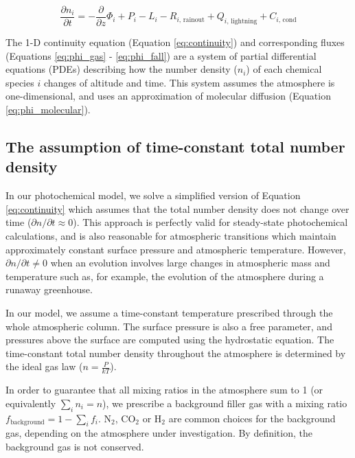 \documentclass{article}
\begin{document}
\begin{equation} \label{eq:continuity}
\frac{\partial n_{i}}{\partial t} = - \frac{\partial}{\partial z}\Phi_{i} + P_{i} - L_{i} - R_{i\text{, rainout}} + Q_{i\text{, lightning}} + C_{i\text{, cond}}
\end{equation}

The 1-D continuity equation (Equation \eqref{eq:continuity}) and corresponding fluxes (Equations \eqref{eq:phi_gas} - \eqref{eq:phi_fall}) are a system of partial differential equations (PDEs) describing how the number density ($n_{i}$) of each chemical species $i$ changes of altitude and time. This system assumes the atmosphere is one-dimensional, and uses an approximation of molecular diffusion (Equation \eqref{eq:phi_molecular}).

\subsection{The assumption of time-constant total number density} \label{sec:assume_const_num_den}

In our photochemical model, we solve a simplified version of Equation \eqref{eq:continuity} which assumes that the total number density does not change over time ($\partial n / \partial t \approx 0$). This approach is perfectly valid for steady-state photochemical calculations, and is also reasonable for atmospheric transitions which maintain approximately constant surface pressure and atmospheric temperature. However, $\partial n / \partial t \neq 0$ when an evolution involves large changes in atmospheric mass and temperature such as, for example, the evolution of the atmosphere during a runaway greenhouse.

In our model, we assume a time-constant temperature prescribed through the whole atmospheric column. The surface pressure is also a free parameter, and pressures above the surface are computed using the hydrostatic equation. The time-constant total number density throughout the atmosphere is determined by the ideal gas law ($n = \frac{P}{kT}$).

In order to guarantee that all mixing ratios in the atmosphere sum to 1 (or equivalently $\sum_i n_i = n$), we prescribe a background filler gas with a mixing ratio $f_\mathrm{background} = 1 - \sum_i f_i$. N$_2$, CO$_2$ or H$_2$ are common choices for the background gas, depending on the atmosphere under investigation. By definition, the background gas is not conserved.

\end{document}
